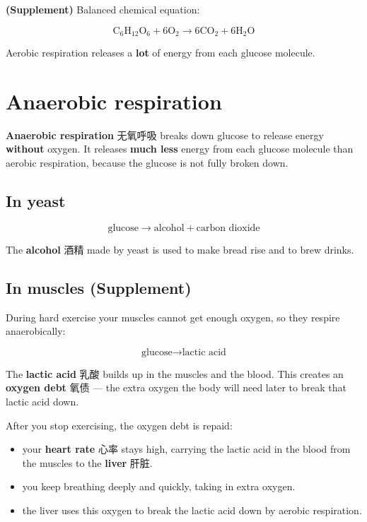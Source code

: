 \documentclass[11pt]{article}
\begin{document}
\textbf{(Supplement)} Balanced chemical equation:

\[
\text{C}_6\text{H}_{12}\text{O}_6 + 6\text{O}_2 \rightarrow 6\text{CO}_2 + 6\text{H}_2\text{O}
\]

Aerobic respiration releases a \textbf{lot} of energy from each glucose molecule.

\section*{Anaerobic respiration}

\textbf{Anaerobic respiration} 无氧呼吸 breaks down glucose to release energy \textbf{without} oxygen. It releases \textbf{much less} energy from each glucose molecule than aerobic respiration, because the glucose is not fully broken down.

\subsection*{In yeast}

\[
\text{glucose} \rightarrow \text{alcohol} + \text{carbon dioxide}
\]

The \textbf{alcohol} 酒精 made by yeast is used to make bread rise and to brew drinks.

\subsection*{In muscles (Supplement)}

During hard exercise your muscles cannot get enough oxygen, so they respire anaerobically:

\[
\text{glucose} \rightarrow \text{lactic acid}
\]

The \textbf{lactic acid} 乳酸 builds up in the muscles and the blood. This creates an \textbf{oxygen debt} 氧债 — the extra oxygen the body will need later to break that lactic acid down.

After you stop exercising, the oxygen debt is repaid:

\begin{itemize}
\item your \textbf{heart rate} 心率 stays high, carrying the lactic acid in the blood from the muscles to the \textbf{liver} 肝脏.

\item you keep breathing deeply and quickly, taking in extra oxygen.

\item the liver uses this oxygen to break the lactic acid down by aerobic respiration.

\end{itemize}
\end{document}
